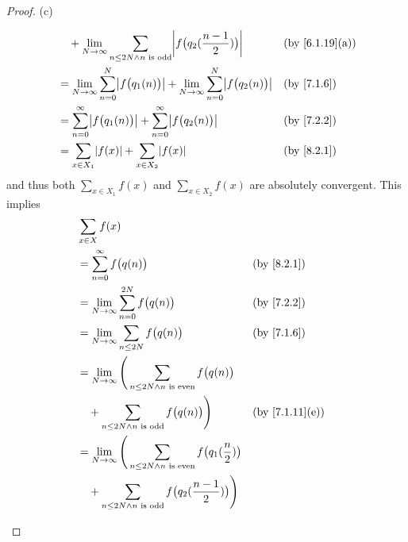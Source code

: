\begin{proof}{(c)}
\begin{itemize}
\begin{align*}
             & \quad + \lim_{N \to \infty} \sum_{n \leq 2N \land n \text{ is odd}} \abs{f\big(q_2(\dfrac{n - 1}{2})\big)}                &  & \text{(by \cref{6.1.19}(a))} \\
             & = \lim_{N \to \infty} \sum_{n = 0}^N \abs{f\big(q_1(n)\big)} + \lim_{N \to \infty} \sum_{n = 0}^N \abs{f\big(q_2(n)\big)} &  & \text{(by \cref{7.1.6})}     \\
             & = \sum_{n = 0}^\infty \abs{f\big(q_1(n)\big)} + \sum_{n = 0}^\infty \abs{f\big(q_2(n)\big)}                               &  & \text{(by \cref{7.2.2})}     \\
             & = \sum_{x \in X_1} \abs{f(x)} + \sum_{x \in X_2} \abs{f(x)}                                                               &  & \text{(by \cref{8.2.1})}
          \end{align*}
          and thus both \(\sum_{x \in X_1} f(x)\) and \(\sum_{x \in X_2} f(x)\) are absolutely convergent.
          This implies
          \begin{align*}
             & \sum_{x \in X} f(x)                                                                                                                             \\
             & = \sum_{n = 0}^\infty f\big(q(n)\big)                                                                         &  & \text{(by \cref{8.2.1})}     \\
             & = \lim_{N \to \infty} \sum_{n = 0}^{2N} f\big(q(n)\big)                                                       &  & \text{(by \cref{7.2.2})}     \\
             & = \lim_{N \to \infty} \sum_{n \leq 2N} f\big(q(n)\big)                                                        &  & \text{(by \cref{7.1.6})}     \\
             & = \lim_{N \to \infty} \Bigg(\sum_{n \leq 2N \land n \text{ is even}} f\big(q(n)\big)                                                            \\
             & \quad + \sum_{n \leq 2N \land n \text{ is odd}} f\big(q(n)\big)\Bigg)                                         &  & \text{(by \cref{7.1.11}(e))} \\
             & = \lim_{N \to \infty} \Bigg(\sum_{n \leq 2N \land n \text{ is even}} f\big(q_1(\dfrac{n}{2})\big)                                               \\
             & \quad + \sum_{n \leq 2N \land n \text{ is odd}} f\big(q_2(\dfrac{n - 1}{2})\big)\Bigg)                                                          \\

\end{align*}
\end{itemize}
\end{proof}
